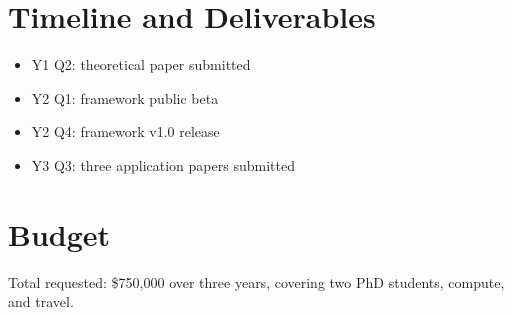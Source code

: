 \documentclass[11pt]{article}
\begin{document}
\section{Timeline and Deliverables}
\begin{itemize}
  \item Y1 Q2: theoretical paper submitted
  \item Y2 Q1: framework public beta
  \item Y2 Q4: framework v1.0 release
  \item Y3 Q3: three application papers submitted
\end{itemize}

\section{Budget}
Total requested: \$750{,}000 over three years, covering two PhD students, compute, and travel.
\end{document}
